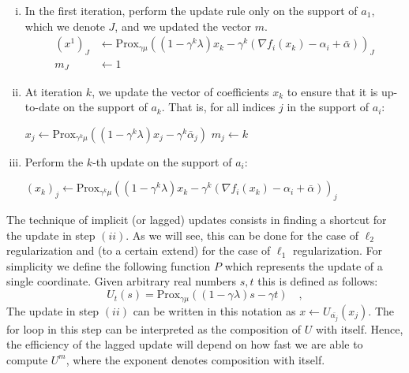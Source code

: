 \documentclass{scrartcl}
\begin{document}
\begin{enumerate}[(i)]
\item In the first iteration, perform the update rule only on the support of $a_1$, which we denote $J$, and we updated the vector $m$.
$$
\begin{aligned}
(x^1)_J &\leftarrow \text{Prox}_{\gamma \mu}((1 - \gamma^k \lambda)x_k - \gamma^k (\nabla f_i(x_k) - {\alpha}_i + \bar{\alpha}))_J \\
m_J &\leftarrow 1
\end{aligned}
$$
\item At iteration $k$, we update the vector of coefficients $x_k$ to ensure that it is up-to-date on the support of $a_k$. That is, for all indices $j$ in the support of $a_i$: 
\begin{algorithmic}
\State $x_j \gets \text{Prox}_{\gamma^k \mu}((1 - \gamma^k \lambda)x_j - \gamma^k \bar{\alpha}_j)$
\EndFor
\State $m_j \gets k$ 
\EndFor
\end{algorithmic}
\item Perform the $k$-th update on the support of $a_i$:
\begin{algorithmic}
\State $(x_k)_j \gets \text{Prox}_{\gamma^k \mu}((1 - \gamma^k \lambda)x_k - \gamma^k (\nabla f_i(x_k) - {\alpha}_i + \bar{\alpha}))_j$
\EndFor
\end{algorithmic}
\end{enumerate}

The technique of implicit (or lagged) updates consists in finding a shortcut for the update in step $(ii)$. As we will see, this can be done for the case of $\ell_2$ regularization and (to a certain extend) for the case of $\ell_1$ regularization. For simplicity we define the following function $P$ which represents the update of a single coordinate. Given arbitrary real numbers $s, t$ this is defined as follows:
$$
U_t(s) = \text{{Prox}}_{\gamma \mu}((1 - \gamma \lambda)s - \gamma t) \quad,
$$
The update in step $(ii)$ can be written in this notation as $x \leftarrow U_{\bar{\alpha_j}}(x_j)$. The for loop in this step can be interpreted as the composition of $U$ with itself. Hence, the efficiency of the lagged update will depend on how fast we are able to compute $U^m$, where the exponent denotes composition with itself.
\end{document}

